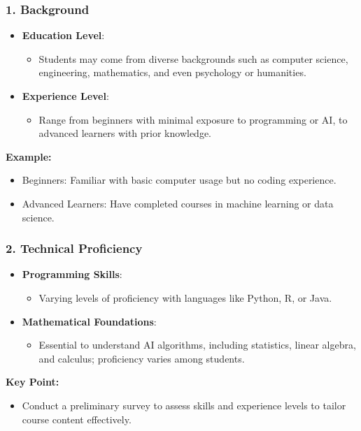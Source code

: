 \documentclass[aspectratio=169]{beamer}
\begin{document}
\begin{frame}[fragile]
    \frametitle{1. Background}
    \begin{itemize}
        \item \textbf{Education Level}:
            \begin{itemize}
                \item Students may come from diverse backgrounds such as computer science, engineering, mathematics, and even psychology or humanities.
            \end{itemize}
        \item \textbf{Experience Level}:
            \begin{itemize}
                \item Range from beginners with minimal exposure to programming or AI, to advanced learners with prior knowledge.
            \end{itemize}
    \end{itemize}
    
    \textbf{Example:}
    \begin{itemize}
        \item Beginners: Familiar with basic computer usage but no coding experience.
        \item Advanced Learners: Have completed courses in machine learning or data science.
    \end{itemize}
\end{frame}

\begin{frame}[fragile]
    \frametitle{2. Technical Proficiency}
    \begin{itemize}
        \item \textbf{Programming Skills}:
            \begin{itemize}
                \item Varying levels of proficiency with languages like Python, R, or Java.
            \end{itemize}
        \item \textbf{Mathematical Foundations}:
            \begin{itemize}
                \item Essential to understand AI algorithms, including statistics, linear algebra, and calculus; proficiency varies among students.
            \end{itemize}
    \end{itemize}
    
    \textbf{Key Point:}
    \begin{itemize}
        \item Conduct a preliminary survey to assess skills and experience levels to tailor course content effectively.
    \end{itemize}
\end{frame}
\end{document}

